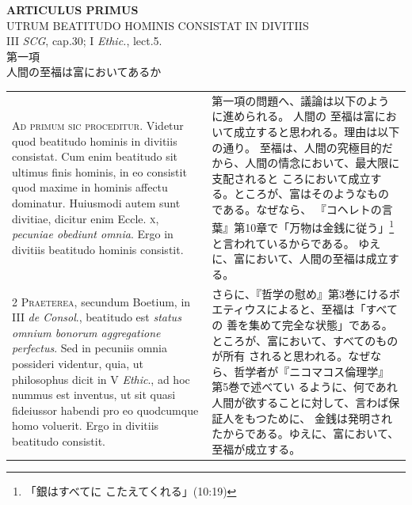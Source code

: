 \documentclass[paper=a4paper,fontsize=10pt,jafontsize=9pt,titlepage]{jlreq}
\begin{document}
\newpage
{}
\begin{center}
 {\Large {\bfseries ARTICULUS PRIMUS}}\\
 {\large UTRUM BEATITUDO HOMINIS CONSISTAT IN DIVITIIS}\\
 {\footnotesize III {\itshape SCG}, cap.30; I {\itshape Ethic.}, lect.5.}\\
 {\Large 第一項\\人間の至福は富においてあるか}
\end{center}

\begin{longtable}{p{21em}p{21em}}
{\scshape  Ad primum sic proceditur}. Videtur quod
 beatitudo hominis in divitiis consistat. Cum enim beatitudo sit ultimus
 finis hominis, in eo consistit quod maxime in hominis affectu
 dominatur. Huiusmodi autem sunt divitiae, dicitur enim Eccle. {\scshape x},
 {\itshape pecuniae obediunt omnia}. Ergo in divitiis beatitudo hominis consistit.

 
&

 第一項の問題へ、議論は以下のように進められる。
 人間の 至福は富において成立すると思われる。理由は以下の通り。
 至福は、人間の究極目的だから、人間の情念において、最大限に支配されると
 ころにおいて成立する。ところが、富はそのようなものである。なぜなら、
 『コヘレトの言葉』第10章で「万物は金銭に従う」\footnote{「銀はすべてに
 こたえてくれる」(10:19)}と言われているからである。
 ゆえに、富において、人間の至福は成立する。

\\




{\scshape 2 Praeterea}, secundum Boetium, in III {\itshape de
 Consol}., beatitudo est {\itshape status omnium bonorum aggregatione
 perfectus}. Sed in pecuniis omnia possideri videntur, quia, ut
 philosophus dicit in V {\itshape Ethic}., ad hoc nummus est inventus, ut sit quasi
 fideiussor habendi pro eo quodcumque homo voluerit. Ergo in divitiis
 beatitudo consistit.

 
&

 さらに、『哲学の慰め』第3巻にけるボエティウスによると、至福は「すべての
 善を集めて完全な状態」である。ところが、富において、すべてのものが所有
 されると思われる。なぜなら、哲学者が『ニコマコス倫理学』第5巻で述べてい
 るように、何であれ人間が欲することに対して、言わば保証人をもつために、
 金銭は発明されたからである。ゆえに、富において、至福が成立する。
 
 

\\





\end{longtable}
\end{document}
